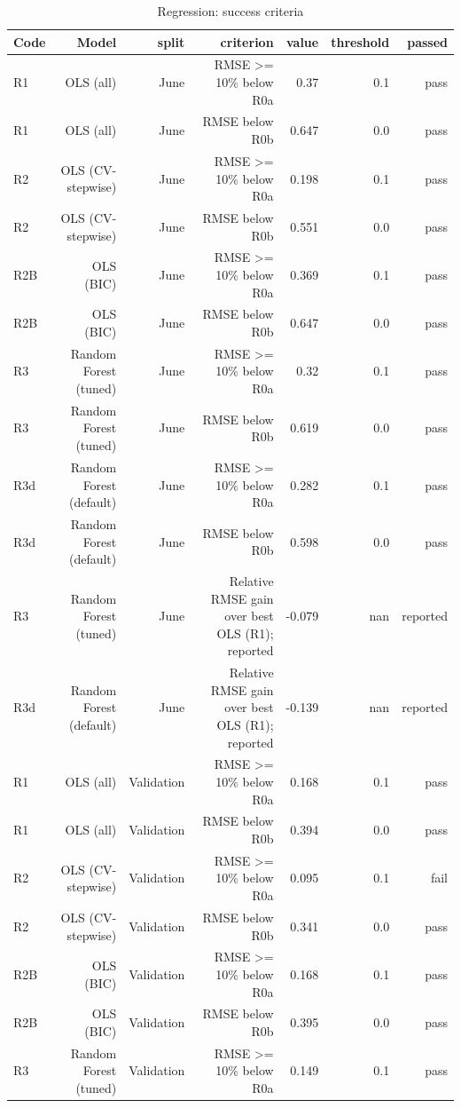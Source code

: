 \begin{table}[htbp]
\centering
\small
\caption{Regression: success criteria}
\begin{tabular}{lrrrrrr}
\toprule
Code & Model & split & criterion & value & threshold & passed \\
\midrule
R1 & OLS (all) & June & RMSE >= 10\% below R0a & 0.37 & 0.1 & pass \\
R1 & OLS (all) & June & RMSE below R0b & 0.647 & 0.0 & pass \\
R2 & OLS (CV-stepwise) & June & RMSE >= 10\% below R0a & 0.198 & 0.1 & pass \\
R2 & OLS (CV-stepwise) & June & RMSE below R0b & 0.551 & 0.0 & pass \\
R2B & OLS (BIC) & June & RMSE >= 10\% below R0a & 0.369 & 0.1 & pass \\
R2B & OLS (BIC) & June & RMSE below R0b & 0.647 & 0.0 & pass \\
R3 & Random Forest (tuned) & June & RMSE >= 10\% below R0a & 0.32 & 0.1 & pass \\
R3 & Random Forest (tuned) & June & RMSE below R0b & 0.619 & 0.0 & pass \\
R3d & Random Forest (default) & June & RMSE >= 10\% below R0a & 0.282 & 0.1 & pass \\
R3d & Random Forest (default) & June & RMSE below R0b & 0.598 & 0.0 & pass \\
R3 & Random Forest (tuned) & June & Relative RMSE gain over best OLS (R1); reported & -0.079 & nan & reported \\
R3d & Random Forest (default) & June & Relative RMSE gain over best OLS (R1); reported & -0.139 & nan & reported \\
R1 & OLS (all) & Validation & RMSE >= 10\% below R0a & 0.168 & 0.1 & pass \\
R1 & OLS (all) & Validation & RMSE below R0b & 0.394 & 0.0 & pass \\
R2 & OLS (CV-stepwise) & Validation & RMSE >= 10\% below R0a & 0.095 & 0.1 & fail \\
R2 & OLS (CV-stepwise) & Validation & RMSE below R0b & 0.341 & 0.0 & pass \\
R2B & OLS (BIC) & Validation & RMSE >= 10\% below R0a & 0.168 & 0.1 & pass \\
R2B & OLS (BIC) & Validation & RMSE below R0b & 0.395 & 0.0 & pass \\
R3 & Random Forest (tuned) & Validation & RMSE >= 10\% below R0a & 0.149 & 0.1 & pass \\

\end{tabular}
\end{table}
